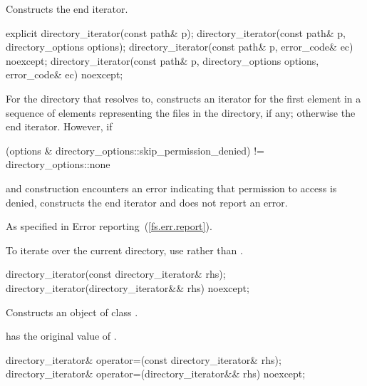 \begin{itemdescr}
\pnum
\effects Constructs the end iterator.
\end{itemdescr}

\begin{itemdecl}
explicit directory_iterator(const path& p);
directory_iterator(const path& p, directory_options options);
directory_iterator(const path& p, error_code& ec) noexcept;
directory_iterator(const path& p, directory_options options, error_code& ec) noexcept;

\end{itemdecl}

\begin{itemdescr}

\pnum
\effects For the directory that  resolves to, constructs an
iterator for the first element in a sequence of 
elements representing the files in the directory, if any; otherwise the end
iterator. However, if
\begin{codeblock}
(options & directory_options::skip_permission_denied) != directory_options::none
\end{codeblock}
and construction encounters an error indicating
that permission to access  is denied, constructs the end iterator
and does not report an error.

\pnum
\throws As specified in Error reporting~(\ref{fs.err.report}).

\pnum
\enternote To iterate over the current directory, use  rather than . \exitnote
\end{itemdescr}

\begin{itemdecl}
directory_iterator(const directory_iterator& rhs);
directory_iterator(directory_iterator&& rhs) noexcept;
\end{itemdecl}

\begin{itemdescr}
\pnum
\effects Constructs an object of class .

\pnum
\postconditions {} has the original value of .
\end{itemdescr}

\begin{itemdecl}
directory_iterator& operator=(const directory_iterator& rhs);
directory_iterator& operator=(directory_iterator&& rhs) noexcept;
\end{itemdecl}

